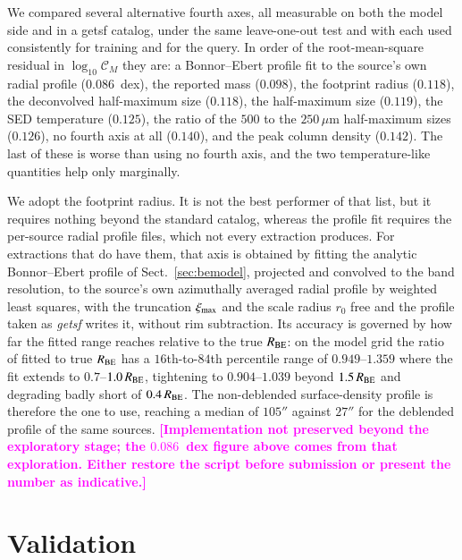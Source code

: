 \documentclass{aa}
\newcommand{\draftnote}[1]{\textcolor{magenta}{\textbf{[#1]}}}
\newcommand{\ximax}{\xi_{\rm max}}
\newcommand{\rzero}{r_{0}}
\newcommand{\Rbe}{R_{\rm BE}}
\newcommand{\CM}{\mathcal{C}_{M}}
\begin{document}
We compared several alternative fourth axes, all measurable on both the
model side and in a getsf catalog, under the same leave-one-out test and
with each used consistently for training and for the query. In order of the
root-mean-square residual in $\log_{10}\CM$ they are: a Bonnor--Ebert
profile fit to the source's own radial profile ($0.086$~dex), the reported
mass ($0.098$), the footprint radius ($0.118$), the deconvolved half-maximum
size ($0.118$), the half-maximum size ($0.119$), the SED temperature
($0.125$), the ratio of the $500$ to the $250\,\mu$m half-maximum sizes
($0.126$), no fourth axis at all ($0.140$), and the peak column density
($0.142$). The last of these is worse than using no fourth axis, and the two
temperature-like quantities help only marginally.

We adopt the footprint radius. It is not the best performer of that list,
but it requires nothing beyond the standard catalog, whereas the profile fit
requires the per-source radial profile files, which not every extraction
produces. For extractions that do have them, that axis is obtained by fitting
the analytic Bonnor--Ebert profile of Sect.~\ref{sec:bemodel}, projected and
convolved to the band resolution, to the source's own azimuthally averaged
radial profile by weighted least squares, with the truncation $\ximax$ and the
scale radius $\rzero$ free and the profile taken as \emph{getsf} writes it,
without rim subtraction. Its accuracy is governed by how far the fitted range
reaches relative to the true $\Rbe$: on the model grid the ratio of fitted to
true $\Rbe$ has a $16$th-to-$84$th percentile range of $0.949$--$1.359$ where
the fit extends to $0.7$--$1.0\,\Rbe$, tightening to $0.904$--$1.039$ beyond
$1.5\,\Rbe$ and degrading badly short of $0.4\,\Rbe$. The non-deblended
surface-density profile is therefore the one to use, reaching a median of
$105''$ against $27''$ for the deblended profile of the same sources.
\draftnote{Implementation not preserved beyond the exploratory stage; the
$0.086$~dex figure above comes from that exploration. Either restore the
script before submission or present the number as indicative.}

\section{Validation}
\label{sec:validation}
\end{document}
